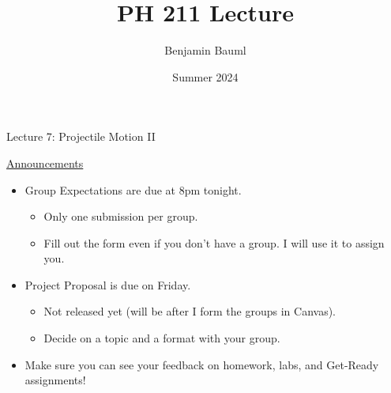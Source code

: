 \documentclass[]{article}
\title{PH 211 Lecture \Week}
\author{Benjamin Bauml}
\date{Summer 2024}
\begin{document}
\begin{TeacherMargin}

\end{TeacherMargin}
\begin{PresentSpace}
\begin{center}
	\huge Lecture 7: Projectile Motion II
\end{center}
\vspace{-0.3cm}
\underline{Announcements}
\begin{itemize}
	\item Group Expectations are due at 8pm tonight.
	\begin{itemize}
		\item Only one submission per group.
		\item Fill out the form even if you don't have a group. I will use it to assign you.
	\end{itemize}
	\item Project Proposal is due on Friday.
	\begin{itemize}
		\item Not released yet (will be after I form the groups in Canvas).
		\item Decide on a topic and a format with your group.
	\end{itemize}
	\item Make sure you can see your feedback on homework, labs, and Get-Ready assignments!
\end{itemize}
\end{PresentSpace}
\newpage
\end{document}

